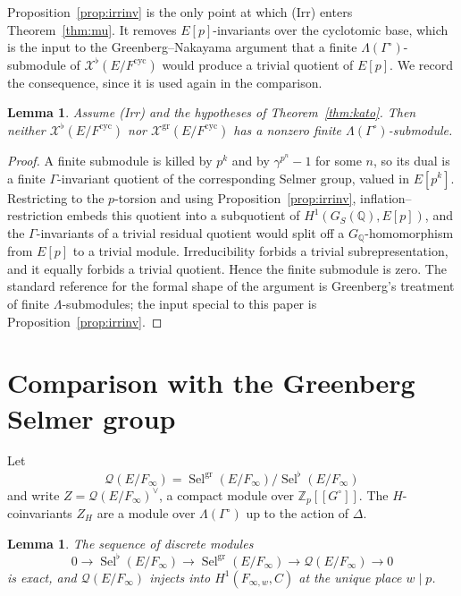\documentclass[11pt]{article}
\newtheorem{lemma}[theorem]{Lemma}
\theoremstyle{definition}
\theoremstyle{remark}
\newcommand{\Z}{\mathbb{Z}}
\newcommand{\Q}{\mathbb{Q}}
\newcommand{\Sel}{\operatorname{Sel}}
\newcommand{\cyc}{\mathrm{cyc}}
\newcommand{\gr}{\mathrm{gr}}
\newcommand{\flatp}{\flat}
\newcommand{\cX}{\mathcal{X}}
\newcommand{\cQ}{\mathcal{Q}}
\newcommand{\Lam}{\Lambda}
\newcommand{\Gp}{G^{\circ}}
\newcommand{\Gam}{\Gamma^{\circ}}
\begin{document}
Proposition~\ref{prop:irrinv} is the only point at which (Irr) enters Theorem~\ref{thm:mu}. It removes \(E[p]\)-invariants over the cyclotomic base, which is the input to the Greenberg--Nakayama argument that a finite \(\Lam(\Gam)\)-submodule of \(\cX^{\flatp}(E/F^{\cyc})\) would produce a trivial quotient of \(E[p]\). We record the consequence, since it is used again in the comparison.

\begin{lemma}
\label{lem:nofinite}
Assume \textup{(Irr)} and the hypotheses of Theorem~\ref{thm:kato}. Then neither \(\cX^{\flatp}(E/F^{\cyc})\) nor \(\cX^{\gr}(E/F^{\cyc})\) has a nonzero finite \(\Lam(\Gam)\)-submodule.
\end{lemma}

\begin{proof}
A finite submodule is killed by \(p^k\) and by \(\gamma^{p^n}-1\) for some \(n\), so its dual is a finite \(\Gamma\)-invariant quotient of the corresponding Selmer group, valued in \(E[p^k]\). Restricting to the \(p\)-torsion and using Proposition~\ref{prop:irrinv}, inflation--restriction embeds this quotient into a subquotient of \(H^1(G_S(\Q),E[p])\), and the \(\Gamma\)-invariants of a trivial residual quotient would split off a \(G_\Q\)-homomorphism from \(E[p]\) to a trivial module. Irreducibility forbids a trivial subrepresentation, and it equally forbids a trivial quotient. Hence the finite submodule is zero. The standard reference for the formal shape of the argument is Greenberg's treatment of finite \(\Lambda\)-submodules; the input special to this paper is Proposition~\ref{prop:irrinv}.
\end{proof}

\section{Comparison with the Greenberg Selmer group}
\label{sec:compare}

Let
\[
\cQ(E/F_\infty)
=
\Sel^{\gr}(E/F_\infty)\big/\Sel^{\flatp}(E/F_\infty)
\]
and write \(Z=\cQ(E/F_\infty)^\vee\), a compact module over \(\Z_p[[\Gp]]\). The \(H\)-coinvariants \(Z_H\) are a module over \(\Lam(\Gam)\) up to the action of \(\Delta\).

\begin{lemma}
\label{lem:exactQ}
The sequence of discrete modules
\begin{equation}
\label{eq:Q}
0\to
\Sel^{\flatp}(E/F_\infty)
\to
\Sel^{\gr}(E/F_\infty)
\to
\cQ(E/F_\infty)
\to 0
\end{equation}
is exact, and \(\cQ(E/F_\infty)\) injects into \(H^1(F_{\infty,w},C)\) at the unique place \(w\mid p\).
\end{lemma}
\end{document}
